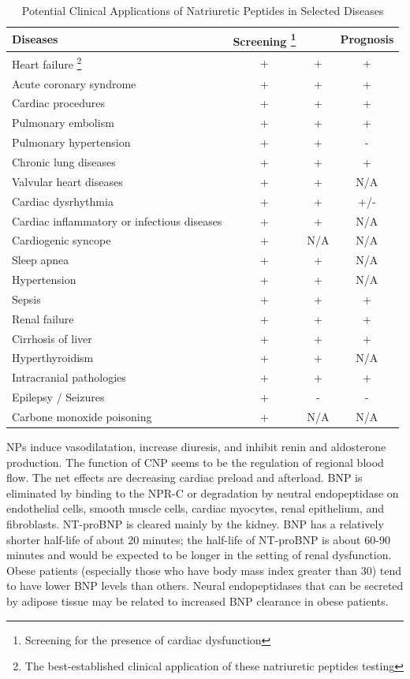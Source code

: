 \documentclass[14pt,a4paper,onecolumn]{article}
\begin{document}
\begin{table}
    \caption{Potential Clinical Applications of Natriuretic Peptides in Selected Diseases}
    \begin{tabular}{|l|c|c|c|}
        \hline
        Diseases & Screening \footnote{Screening for the presence of cardiac dysfunction} &  & Prognosis \\
        \hline
        Heart failure \footnote{The best-established clinical application of these natriuretic peptides testing} & + & + & + \\
        Acute coronary syndrome & + & + & + \\
        Cardiac procedures & + & + & + \\
        Pulmonary embolism & + & + & + \\
        Pulmonary hypertension & + & + & - \\
        Chronic lung diseases & + & + & + \\
        Valvular heart diseases & + & + & N/A \\
        Cardiac dysrhythmia & + & + & +/- \\
        Cardiac inflammatory or infectious diseases & + & + & N/A \\
        Cardiogenic syncope & + & N/A & N/A \\
        Sleep apnea & + & + & N/A \\
        Hypertension & + & + & N/A \\
        Sepsis & + & + & + \\
        Renal failure & + & + & + \\
        Cirrhosis of liver & + & + & + \\
        Hyperthyroidism & + & + & N/A \\
        Intracranial pathologies & + & + & + \\
        Epilepsy / Seizures & + & - & - \\
        Carbone monoxide poisoning & + & N/A & N/A \\
        \hline
    \end{tabular}
    \label{NP_applications}
\end{table}

NPs induce vasodilatation, increase diuresis, and inhibit renin and aldosterone production. The function of CNP seems to be the regulation of regional blood flow. The net effects are decreasing cardiac preload and afterload. BNP is eliminated by binding to the NPR-C or degradation by neutral endopeptidase on endothelial cells, smooth muscle cells, cardiac myocytes, renal epithelium, and fibroblasts. NT-proBNP is cleared mainly by the kidney.\citep{Schrier1999}  BNP has a relatively shorter half-life of about 20 minutes; the half-life of NT-proBNP is about 60-90 minutes and would be expected to be longer in the setting of renal dysfunction. Obese patients (especially those who have body mass index greater than 30) tend to have lower BNP levels than others. Neural endopeptidases that can be secreted by adipose tissue may be related to increased BNP clearance in obese patients.\citep{Young2004}
\end{document}
